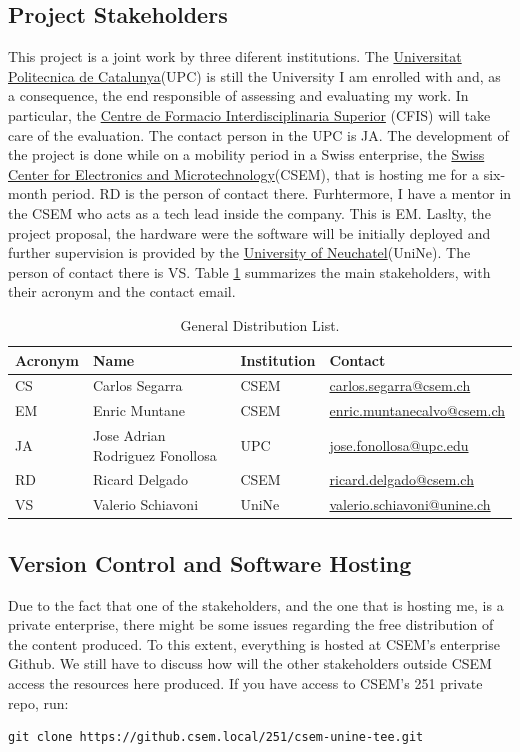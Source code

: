 \documentclass{article}
\begin{document}
\subsection{Project Stakeholders}
This project is a joint work by three diferent institutions. The \href{https://www.upc.edu/}{Universitat Politecnica de Catalunya}(UPC) is still the University I am enrolled with and, as a consequence, the end responsible of assessing and evaluating my work. In particular, the \href{https://cfis.upc.edu/}{Centre de Formacio Interdisciplinaria Superior} (CFIS) will take care of the evaluation. The contact person in the UPC is JA. The development of the project is done while on a mobility period in a Swiss enterprise, the \href{https://www.csem.ch}{Swiss Center for Electronics and Microtechnology}(CSEM), that is hosting me for a six-month period. RD is the person of contact there. Furhtermore, I have a mentor in the CSEM who acts as a tech lead inside the company. This is EM. Laslty, the project proposal, the hardware were the software will be initially deployed and further supervision is provided by the \href{https://www.unine.ch}{University of Neuchatel}(UniNe). The person of contact there is VS. Table \ref{table:distribution-list} summarizes the main stakeholders, with their acronym and the contact email.
\begin{table}[h!]
\centering
\begin{tabular}{llll}
\hline
\textbf{Acronym} & \textbf{Name} & \textbf{Institution} & \textbf{Contact} \\[3pt]
\hline \hline
CS & Carlos Segarra & CSEM & \href{mailto:carlos.segarra@csem.ch}{carlos.segarra@csem.ch} \\[3pt]
EM & Enric Muntane & CSEM & \href{mailto:enric.muntanecalvo@csem.ch}{enric.muntanecalvo@csem.ch} \\[3pt]
JA & Jose Adrian Rodriguez Fonollosa & UPC & \href{mailto:jose.fonollosa@upc.edu}{jose.fonollosa@upc.edu} \\[3pt]
RD & Ricard Delgado & CSEM & \href{mailto:ricar.delgado@csem.ch}{ricard.delgado@csem.ch} \\[3pt]
VS & Valerio Schiavoni & UniNe & \href{mailto:valerio.schiavoni@unine.ch}{valerio.schiavoni@unine.ch} \\[3pt]
\hline
\end{tabular}
\caption{General Distribution List. \label{table:distribution-list}}
\end{table}

\subsection{Version Control and Software Hosting}
Due to the fact that one of the stakeholders, and the one that is hosting me, is a private enterprise, there might be some issues regarding the free distribution of the content produced. To this extent, everything is hosted at CSEM's enterprise Github. We still have to discuss how will the other stakeholders outside CSEM access the resources here produced. If you have access to CSEM's 251 private repo, run:
\begin{lstlisting}[numbers=none]
git clone https://github.csem.local/251/csem-unine-tee.git
\end{lstlisting}
\end{document}
